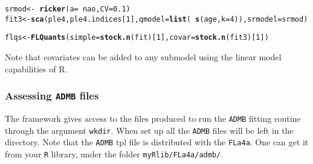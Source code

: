 \documentclass[a4paper,english,10pt]{article}\usepackage[]{graphicx}\usepackage[]{color}
\makeatletter
\newcommand{\hlnum}[1]{\textcolor[rgb]{0.686,0.059,0.569}{#1}}%
\newcommand{\hlopt}[1]{\textcolor[rgb]{0,0,0}{#1}}%
\newcommand{\hlstd}[1]{\textcolor[rgb]{0.345,0.345,0.345}{#1}}%
\newcommand{\hlkwb}[1]{\textcolor[rgb]{0.69,0.353,0.396}{#1}}%
\newcommand{\hlkwc}[1]{\textcolor[rgb]{0.333,0.667,0.333}{#1}}%
\newcommand{\hlkwd}[1]{\textcolor[rgb]{0.737,0.353,0.396}{\textbf{#1}}}%
\newenvironment{kframe}{%
 \def\at@end@of@kframe{}%
 \ifinner\ifhmode%
  \def\at@end@of@kframe{\end{minipage}}%
  \begin{minipage}{\columnwidth}%
 \fi\fi%
 \def\FrameCommand##1{\hskip\@totalleftmargin \hskip-\fboxsep
 \colorbox{shadecolor}{##1}\hskip-\fboxsep
     \hskip-\linewidth \hskip-\@totalleftmargin \hskip\columnwidth}%
 \MakeFramed {\advance\hsize-\width
   \@totalleftmargin\z@ \linewidth\hsize
   \@setminipage}}%
 {\par\unskip\endMakeFramed%
 \at@end@of@kframe}
\newenvironment{knitrout}{}{} %
\newcommand{\code}[1]{{\texttt{#1}}}
\newcommand{\pkg}[1]{{\texttt{#1}}}
\makeatother
\begin{document}
\begin{knitrout}
\color{fgcolor}\begin{kframe}
\begin{alltt}
\hlstd{srmod} \hlkwb{<-} \hlopt{~} \hlkwd{ricker}\hlstd{(}\hlkwc{a}\hlstd{=}\hlopt{~}\hlstd{nao,} \hlkwc{CV}\hlstd{=}\hlnum{0.1}\hlstd{)}
\hlstd{fit3} \hlkwb{<-} \hlkwd{sca}\hlstd{(ple4, ple4.indices[}\hlnum{1}\hlstd{],} \hlkwc{qmodel}\hlstd{=}\hlkwd{list}\hlstd{(}\hlopt{~}\hlkwd{s}\hlstd{(age,} \hlkwc{k}\hlstd{=}\hlnum{4}\hlstd{)),} \hlkwc{srmodel}\hlstd{=srmod)}
\end{alltt}


{\ttfamily\noindent\bfseries{}}\begin{alltt}
\hlstd{flqs} \hlkwb{<-} \hlkwd{FLQuants}\hlstd{(}\hlkwc{simple}\hlstd{=}\hlkwd{stock.n}\hlstd{(fit)[}\hlnum{1}\hlstd{],} \hlkwc{covar}\hlstd{=}\hlkwd{stock.n}\hlstd{(fit3)[}\hlnum{1}\hlstd{])}
\end{alltt}


{\ttfamily\noindent\bfseries{}}\end{kframe}
\end{knitrout}

\begin{knitrout}
\color{fgcolor}\begin{kframe}


{\ttfamily\noindent\bfseries{}}\end{kframe}
\end{knitrout}

Note that covariates can be added to any submodel using the linear model capabilities of R.

\subsubsection{Assessing \pkg{ADMB} files}

The framework gives access to the files produced to run the \pkg{ADMB} fitting routine through the argument \code{wkdir}. When set up all the \pkg{ADMB} files will be left in the directory. Note that the \pkg{ADMB} tpl file is distributed with the \pkg{FLa4a}. One can get it from your \pkg{R} library, under the folder \code{myRlib/FLa4a/admb/}.
\end{document}
